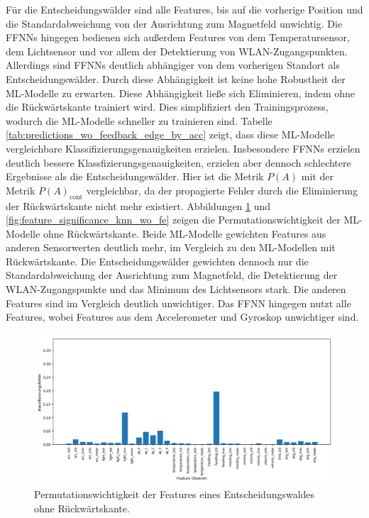 \newline
\newline
Für die Entscheidungswälder sind alle Features, bis auf die vorherige Position und die Standardabweichung von der Ausrichtung zum Magnetfeld unwichtig.
Die FFNNs hingegen bedienen sich außerdem Features von dem Temperatursensor, dem Lichtsensor und vor allem der Detektierung von WLAN-Zugangspunkten.
Allerdings sind FFNNs deutlich abhängiger von dem vorherigen Standort als Entscheidungswälder.
\newline
\newline
Durch diese Abhängigkeit ist keine hohe Robustheit der ML-Modelle zu erwarten.
Diese Abhängigkeit ließe sich Eliminieren, indem ohne die Rückwärtskante trainiert wird.
Dies simplifiziert den Trainingsprozess, wodurch die ML-Modelle schneller zu trainieren sind.
Tabelle \ref{tab:predictions_wo_feedback_edge_by_acc} zeigt, dass diese ML-Modelle vergleichbare Klassifizierungsgenauigkeiten erzielen.
Insbesondere FFNNs erzielen deutlich bessere Klassfizierungsgenauigkeiten, erzielen aber dennoch schlechtere Ergebnisse als die Entscheidungswälder.
Hier ist die Metrik $P(A)$ mit der Metrik $P(A)_{\text{cont}}$ vergleichbar, da der propagierte Fehler durch die Eliminierung der Rückwärtskante nicht mehr existiert.
\newline
\newline
Abbildungen \ref{fig:feature_significance_dt_wo_fe} und \ref{fig:feature_significance_knn_wo_fe} zeigen die Permutationswichtigkeit der ML-Modelle ohne Rückwärtskante.
Beide ML-Modelle gewichten Features aus anderen Sensorwerten deutlich mehr, im Vergleich zu den ML-Modellen mit Rückwärtskante.
Die Entscheidungswälder gewichten dennoch nur die Standardabweichung der Ausrichtung zum Magnetfeld, die Detektierung der WLAN-Zugangspunkte und das Minimum des Lichtsensors stark.
Die anderen Features sind im Vergleich deutlich unwichtiger.
Das FFNN hingegen nutzt alle Features, wobei Features aus dem Accelerometer und Gyroskop unwichtiger sind.
\begin{figure}[h!]
    \centering
    \includegraphics[width=\linewidth]{images/fi_wo_fe_dt.png}
    \caption{Permutationswichtigkeit der Features eines Entscheidungswaldes ohne Rückwärtskante.}
    \label{fig:feature_significance_dt_wo_fe}
\end{figure}

